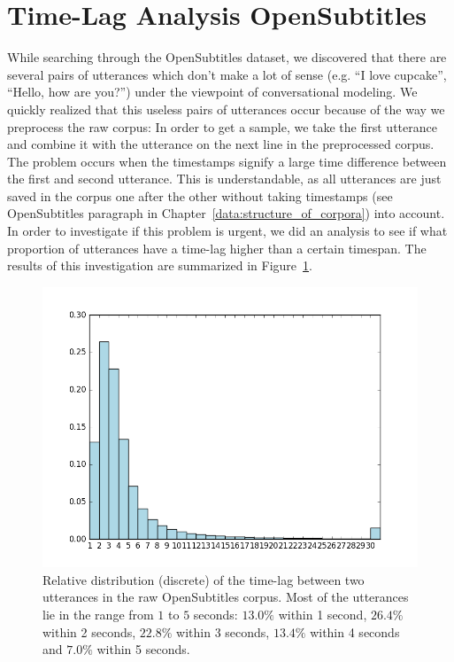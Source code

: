 \section{Time-Lag Analysis OpenSubtitles}
\label{data:opensubtitles:time_lag_analysis}
While searching through the OpenSubtitles dataset, we discovered that there are several pairs of utterances which don't make a lot of sense (e.g. ``I love cupcake'', ``Hello, how are you?'') under the viewpoint of conversational modeling. We quickly realized that this useless pairs of utterances occur because of the way we preprocess the raw corpus: In order to get a sample, we take the first utterance and combine it with the utterance on the next line in the preprocessed corpus. The problem occurs when the timestamps signify a large time difference between the first and second utterance. This is understandable, as all utterances are just saved in the corpus one after the other without taking timestamps (see OpenSubtitles paragraph in Chapter~\ref{data:structure_of_corpora}) into account. In order to investigate if this problem is urgent, we did an analysis to see if what proportion of utterances have a time-lag higher than a certain timespan. The results of this investigation are summarized in Figure~\ref{fig:data:analyze:timediff:opus}.

\begin{figure}[H]
	\centering
	\includegraphics[width=15cm]{img/opus_time_analyze.PNG}
	\caption{Relative distribution (discrete) of the time-lag between two utterances in the raw OpenSubtitles corpus. Most of the utterances lie in the range from $1$ to $5$ seconds: $13.0\%$ within 1 second, $26.4\%$ within 2 seconds, $22.8\%$ within 3 seconds, $13.4\%$ within 4 seconds and  $7.0\%$ within 5 seconds.}
	\label{fig:data:analyze:timediff:opus}
\end{figure}

